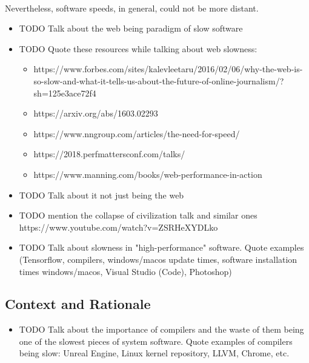 \documentclass[12pt]{article}
\begin{document}
	\paragraph{}
	Nevertheless, software speeds, in general, could not be more distant.\linebreak
	
	\begin{itemize}
		\item TODO Talk about the web being paradigm of slow software
		\item TODO Quote these resources while talking about web slowness:
		
		\begin{itemize}
			\item https://www.forbes.com/sites/kalevleetaru/2016/02/06/why-the-web-is-so-slow-and-what-it-tells-us-about-the-future-of-online-journalism/?sh=125e3ace72f4 
			\item https://arxiv.org/abs/1603.02293
			
			\item https://www.nngroup.com/articles/the-need-for-speed/
			\item https://2018.perfmattersconf.com/talks/
			\item https://www.manning.com/books/web-performance-in-action
		\end{itemize}
	
		\item TODO Talk about it not just being the web
		\item TODO mention the collapse of civilization talk and similar ones \linebreak https://www.youtube.com/watch?v=ZSRHeXYDLko
		\item TODO Talk about slowness in "high-performance" software. Quote examples (Tensorflow, compilers, windows/macos update times, software installation times windows/macos, Visual Studio (Code), Photoshop)
	
	\end{itemize}
	
	\subsection{Context and Rationale}
	
	\begin{itemize}
		\item TODO Talk about the importance of compilers and the waste of them being one of the slowest pieces of system software. Quote examples of compilers being slow: Unreal Engine, Linux kernel repository, LLVM, Chrome, etc.	
	\end{itemize}
\end{document}
